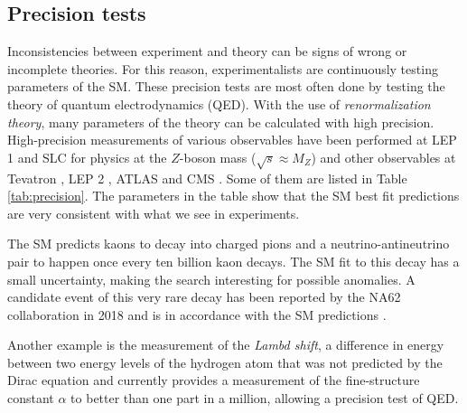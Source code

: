 \subsection{Precision tests}



Inconsistencies between experiment and theory can be signs of wrong or incomplete theories. For this reason, experimentalists are continuously testing parameters of the SM. These precision tests are most often done by testing the theory of quantum electrodynamics (QED). With the use of \textit{renormalization theory}, many parameters of the theory can be calculated with high precision. High-precision measurements of various observables have been performed at LEP 1 and SLC \cite{ALEPH:2005ab,Riemann:2010zz,Abe:2000dq,Abe:2000uc,Abe:2000hk,Abe:1996ef} for physics at the $Z$-boson mass ($\sqrt{s} \approx M_Z$) and other observables at Tevatron \cite{Aaltonen:2013iut,TEW:2010aj}, LEP 2 \cite{TEW:2010aj}, ATLAS \cite{Aaboud:2017svj,ATLASurl1} and CMS \cite{CMSurl1,CMSurl2}. Some of them are listed in Table \ref{tab:precision}. The parameters in the table show that the SM best fit predictions are very consistent with what we see in experiments.

The SM predicts kaons to decay into charged pions and a neutrino-antineutrino pair to happen once every ten billion kaon decays. The SM fit to this decay has a small uncertainty, making the search interesting for possible anomalies. A candidate event of this very rare decay has been reported by the NA62 collaboration in 2018 and is in accordance with the SM predictions \cite{na62}.

Another example is the measurement of the \textit{Lambd shift}, a difference in energy between two energy levels of the hydrogen atom that was not predicted by the Dirac equation and currently provides a measurement of the fine-structure constant $\alpha$ to better than one part in a million, allowing a precision test of QED.

